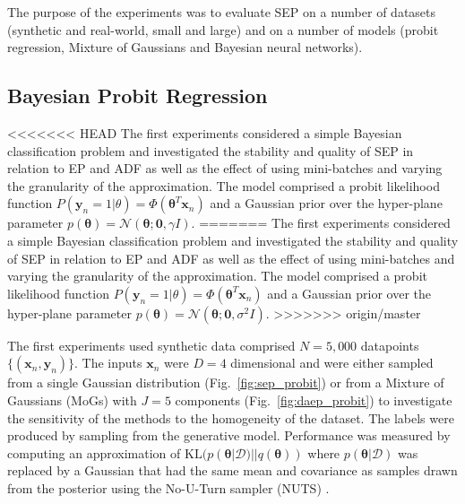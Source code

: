 
The purpose of the experiments was to evaluate SEP on a number of datasets (synthetic and real-world, small and large) and on a number of models (probit regression, Mixture of Gaussians and Bayesian neural networks).

\subsection{Bayesian Probit Regression}
%
<<<<<<< HEAD
The first experiments considered a simple Bayesian classification problem and investigated the stability and quality of SEP in relation to EP and ADF as well as the effect of using mini-batches and varying the granularity of the approximation. The model comprised a probit likelihood function $P(\bm{y}_n = 1|\theta) = \Phi(\bm{\theta}^T \bm{x}_n)$ and a Gaussian prior over the hyper-plane parameter  $p(\bm{\theta}) = \mathcal{N}(\bm{\theta}; \bm{0}, \gamma I)$.  
=======
The first experiments considered a simple Bayesian classification problem and investigated the stability and quality of SEP in relation to EP and ADF as well as the effect of using mini-batches and varying the granularity of the approximation. The model comprised a probit likelihood function $P(\bm{y}_n = 1|\theta) = \Phi(\bm{\theta}^T \bm{x}_n)$ and a Gaussian prior over the hyper-plane parameter  $p(\bm{\theta}) = \mathcal{N}(\bm{\theta}; \bm{0}, \sigma^2 I)$.  
>>>>>>> origin/master

The first experiments used synthetic data comprised $N=5,000$ datapoints $\{ (\bm{x}_n, \bm{y}_n) \}$. The inputs $\bm{x}_n$ were $D=4$ dimensional and were either sampled from a single Gaussian distribution (Fig.~\ref{fig:sep_probit}) or from a Mixture of Gaussians (MoGs) with $J=5$ components (Fig.~\ref{fig:daep_probit}) to investigate the sensitivity of the methods to the homogeneity of the dataset. The labels were produced by sampling from the generative model. Performance was measured by computing an approximation of $\mathrm{KL}(p(\bm{\theta}|\mathcal{D}) || q(\bm{\theta}))$ where $p(\bm{\theta}|\mathcal{D})$ was replaced by a Gaussian that had the same mean and covariance as samples drawn from the posterior using the No-U-Turn sampler (NUTS) \cite{hoffman:nuts}.

